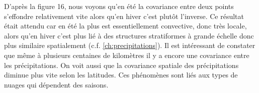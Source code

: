 \documentclass[a4paper,11pt]{article}
\numberwithin{equation}{section}
\begin{document}
D'après la figure 16, nous voyons qu'en été la covariance entre deux points s'effondre relativement vite alors qu'en hiver c'est plutôt l'inverse. Ce résultat était attendu car en été la plus est essentiellement convective, donc très locale, alors qu'en hiver c'est plus lié à des structures stratiformes à grande échelle donc plus similaire spatialement (c.f. \ref{ch:precipitations}).
Il est intéressant de constater que même à plusieurs centaines de kilomètres il y a encore une covariance entre les précipitations. On voit aussi que la covariance spatiale des précipitations diminue plus vite selon les latitudes. Ces phénomènes sont liés aux types de nuages qui dépendent des saisons.

\begin{figure}[H]
	\label{fig-kernel-evap}
\hspace{-1.3cm}
\begin{tabular}{ccc} 

\end{tabular}
\end{figure}
\end{document}
